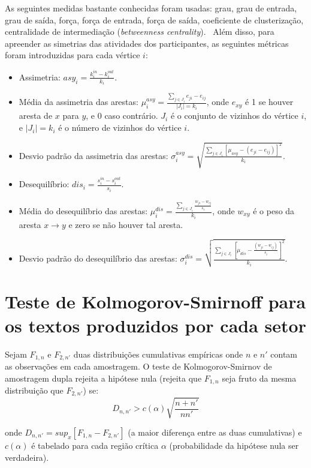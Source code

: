 \documentclass[a4paper,openright,12pt]{report} %
\begin{document}
As seguintes medidas bastante conhecidas foram usadas: grau, grau de entrada, grau de saída,
força, força de entrada, força de saída, coeficiente de clusterização,
centralidade de intermediação (\emph{betweenness centrality}).~\cite{newmanBook}
Além disso, para apreender as simetrias das atividades dos participantes, as
seguintes métricas foram introduzidas para cada vértice $i$:

\begin{itemize}
    \item Assimetria: $asy_i=\frac{k_i^{in}-k_i^{out}}{k_i}$.
    \item Média da assimetria das arestas: $\mu_i^{asy}=\frac{\sum_{j\in J_i} e_{ji}-e_{ij}}{|J_i|=k_i}$, onde $e_{xy}$ é 1 se houver aresta de $x$ para $y$, e $0$ caso contrário. $J_i$ é o conjunto de vizinhos do vértice $i$, e $|J_i|=k_i$ é o número de vizinhos do vértice $i$.
    \item Desvio padrão da assimetria das arestas: $\sigma_i^{asy}=\sqrt{\frac{\sum_{j\in J_i}[\mu_{asy} -(e_{ji}-e_{ij}) ]^2  }{k_i}  }$.
    \item Desequilíbrio: $dis_i=\frac{s_i^{in}-s_i^{out}}{s_i}$.
    \item Média do desequilíbrio das arestas: $\mu_i^{dis}=\frac{\sum_{j \in J_i}\frac{w_{ji}-w_{ij}}{s_i}}{k_i}$, onde $w_{xy}$ é o peso da aresta $x\rightarrow y$ e zero se não houver tal aresta.
    \item Desvio padrão do desequilíbrio das arestas: $\sigma_i^{dis}=\sqrt{\frac{\sum_{j\in J_i}[\mu_{dis}-\frac{(w_{ji}-w_{ij})}{s_i}]^2}{k_i}}$.
\end{itemize}

\section{Teste de Kolmogorov-Smirnoff para os textos produzidos por cada setor}\label{sec:kol}

Sejam $F_{1,n}$ e $F_{2,n'}$ duas distribuições cumulativas empíricas onde 
$n$ e $n'$ contam as observações em cada amostragem.
O teste de Kolmogorov-Smirnov de amostragem dupla 
rejeita a hipótese nula (rejeita que $F_{1,n}$ seja fruto da mesma distribuição que $F_{2,n'}$) se:
\begin{equation}\label{eq:ks}
D_{n,n'} > c(\alpha)\sqrt{\frac{n+n'}{nn'}}
\end{equation}

\noindent onde $D_{n,n'}=sup_x[F_{1,n}-F_{2,n'}]$ (a maior diferença entre as duas cumulativas) e $c(\alpha)$ é tabelado para cada região crítica $\alpha$
(probabilidade da hipótese nula ser verdadeira).
\end{document}
